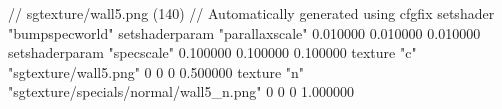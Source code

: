 // sgtexture/wall5.png (140)
// Automatically generated using cfgfix
setshader "bumpspecworld"
setshaderparam "parallaxscale" 0.010000 0.010000 0.010000
setshaderparam "specscale" 0.100000 0.100000 0.100000
texture "c" "sgtexture/wall5.png" 0 0 0 0.500000
texture "n" "sgtexture/specials/normal/wall5_n.png" 0 0 0 1.000000

